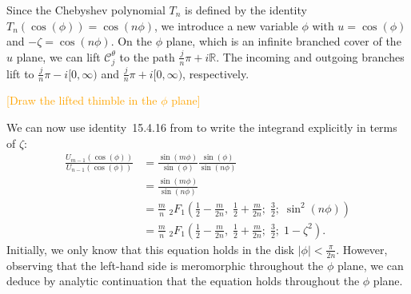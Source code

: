 \documentclass{article}
\newcommand{\R}{\mathbb{R}}
\theoremstyle{definition}
\theoremstyle{plain}
\begin{document}
\color{DarkTurquoise}
Since the Chebyshev polynomial $T_n$ is defined by the identity $T_n(\cos(\phi)) = \cos(n\phi)$, we introduce a new variable $\phi$ with $u = \cos(\phi)$ and $-\zeta = \cos(n\phi)$. On the $\phi$ plane, which is an infinite branched cover of the $u$ plane, we can lift $\mathcal{C}^\theta_j$ to the path $\tfrac{j}{n}\pi + i\R$. The incoming and outgoing branches lift to $\tfrac{j}{n}\pi - i[0, \infty)$ and $\tfrac{j}{n}\pi + i[0, \infty)$, respectively.
\begin{center}
\textcolor{orange}{[Draw the lifted thimble in the $\phi$ plane]}
\end{center}
We can now use identity~15.4.16 from \cite{dlmf} to write the integrand explicitly in terms of $\zeta$:
\begin{align*}
\frac{U_{m-1}(\cos(\phi))}{U_{n-1}(\cos(\phi))} &= \frac{\sin(m\phi)}{\sin(\phi)}\frac{\sin(\phi)}{\sin(n \phi)}\\
& = \frac{\sin(m\phi)}{\sin(n \phi)}\\
& = \frac{m}{n}\;{}_2F_1\left(\frac{1}{2} - \frac{m}{2n},\;\frac{1}{2} + \frac{m}{2n};\;\frac{3}{2};\;\sin^2(n \phi)\right) \\
& = \frac{m}{n}\;{}_2F_1\left(\frac{1}{2} - \frac{m}{2n},\;\frac{1}{2} + \frac{m}{2n};\;\frac{3}{2};\;1 - \zeta^2\right).
\end{align*}
Initially, we only know that this equation holds in the disk $|\phi| < \tfrac{\pi}{2n}$. However, observing that the left-hand side is meromorphic throughout the $\phi$ plane, we can deduce by analytic continuation that the equation holds throughout the $\phi$ plane.
\end{document}
